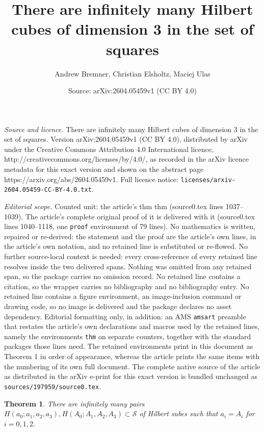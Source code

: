 \documentclass[10pt,a4paper]{amsart}
\title{There are infinitely many Hilbert cubes of dimension 3 in the set of squares}
\author{Andrew Bremner, Christian Elsholtz, Maciej Ulas}
\date{Source: arXiv:2604.05459v1 (CC BY 4.0)}
\newtheorem{thm}{Theorem}
\def\cal{\mathcal}
\begin{document}
\maketitle

\noindent\emph{Source and licence.} There are infinitely many Hilbert cubes of dimension 3 in the set of squares. Version arXiv:2604.05459v1 (CC BY 4.0), distributed by arXiv under the Creative Commons Attribution 4.0 International licence, http://creativecommons.org/licenses/by/4.0/, as recorded in the arXiv licence metadata for this exact version and shown on the abstract page https://arxiv.org/abs/2604.05459v1. Full licence notice: \texttt{licenses/arxiv-2604.05459-CC-BY-4.0.txt}.\par\smallskip

\noindent\textit{Editorial scope.} Counted unit: the article's thm thm (source0.tex lines 1037--1039). The article's complete original proof of it is delivered with it (source0.tex lines 1040--1118, one \texttt{proof} environment of 79 lines). No mathematics is written, repaired or re-derived: the statement and the proof are the article's own lines, in the article's own notation, and no retained line is substituted or re-flowed.  No further source-local context is needed: every cross-reference of every retained line resolves inside the two delivered spans.  Nothing was omitted from any retained span, so the package carries no omission record.  No retained line contains a citation, so the wrapper carries no bibliography and no bibliography entry.  No retained line contains a figure environment, an image-inclusion command or drawing code, so no image is delivered and the package declares no asset dependency.  Editorial formatting only, in addition: an AMS \texttt{amsart} preamble that restates the article's own declarations and macros used by the retained lines, namely the environments \texttt{thm} on separate counters, together with the standard packages those lines need.  The retained environments print in this document as Theorem 1 in order of appearance, whereas the article prints the same items with the numbering of its own full document.  The complete native source of the article as distributed in the arXiv e-print for this exact version is bundled unchanged as \texttt{sources/197959/source0.tex}.
\begin{thm}
    There are infinitely many pairs $H(a_{0}; a_{1}, a_{2}, a_{3}), H(A_0; A_1, A_2, A_3)\subset \cal{S}$ of Hilbert subes such that $a_{i}=A_{i}$ for $i=0, 1, 2$.
\end{thm}
\end{document}
